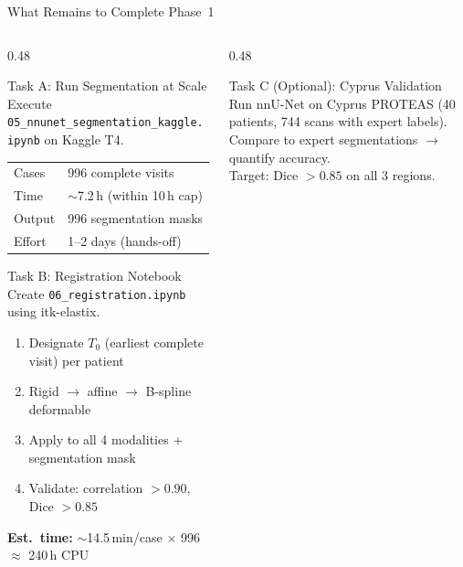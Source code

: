 \documentclass[aspectratio=169, dvipsnames]{beamer}
\begin{document}
\begin{frame}{What Remains to Complete Phase~1}
    \begin{columns}
        \begin{column}{0.48\textwidth}
            \begin{alertblock}{ Task A: Run Segmentation at Scale}
                \small
                Execute \texttt{05\_nnunet\_segmentation\_kaggle.ipynb} on Kaggle T4.\\[0.3em]
                \begin{tabular}{ll}
                    Cases & 996 complete visits \\
                    Time & $\sim$7.2\,h (within 10\,h cap) \\
                    Output & 996 segmentation masks \\
                    Effort & 1--2 days (hands-off) \\
                \end{tabular}
            \end{alertblock}

            \vspace{0.3em}

            \begin{block}{ Task B: Registration Notebook}
                \small
                Create \texttt{06\_registration.ipynb} using itk-elastix.\\[0.2em]
                \scriptsize
                \begin{enumerate}
                    \item Designate $T_0$ (earliest complete visit) per patient
                    \item Rigid $\to$ affine $\to$ B-spline deformable
                    \item Apply to all 4 modalities + segmentation mask
                    \item Validate: correlation $>0.90$, Dice $>0.85$
                \end{enumerate}
                \textbf{Est.\ time:} $\sim$14.5\,min/case $\times$ 996 $\approx$ 240\,h CPU
            \end{block}
        \end{column}

        \begin{column}{0.48\textwidth}
            \begin{block}{ Task C (Optional): Cyprus Validation}
                \small
                Run nnU-Net on Cyprus PROTEAS (40 patients, 744 scans with expert labels).\\[0.2em]
                Compare to expert segmentations $\to$ quantify accuracy.\\[0.2em]
                Target: Dice $>0.85$ on all 3 regions.
            \end{block}


\end{column}
\end{columns}
\end{frame}
\end{document}
